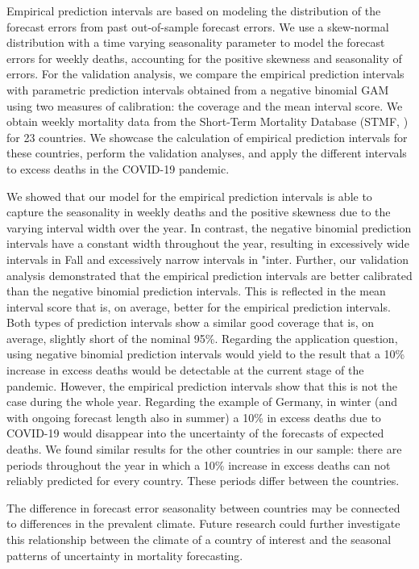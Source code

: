 \documentclass[12pt]{article}
\begin{document}
Empirical prediction intervals are based on modeling the distribution of the forecast errors from past out-of-sample forecast errors. We use a skew-normal distribution with a time varying seasonality parameter to model the forecast errors for weekly deaths, accounting for the positive skewness and seasonality of errors. For the validation analysis, we compare the empirical prediction intervals with parametric prediction intervals obtained from a negative binomial GAM using two measures of calibration: the coverage and the mean interval score. We obtain weekly mortality data from the Short-Term Mortality Database (STMF, \cite{Jdanov2021a}) for 23 countries. We showcase the calculation of empirical prediction intervals for these countries, perform the validation analyses, and apply the different intervals to excess deaths in the COVID-19 pandemic.

We showed that our model for the empirical prediction intervals is able to capture the seasonality in weekly deaths and the positive skewness due to the varying interval width over the year. In contrast, the negative binomial prediction intervals have a constant width throughout the year, resulting in excessively wide intervals in Fall and excessively narrow intervals in "inter. Further, our validation analysis demonstrated that the empirical prediction intervals are better calibrated than the negative binomial prediction intervals. This is reflected in the mean interval score that is, on average, better for the empirical prediction intervals. Both types of prediction intervals show a similar good coverage that is, on average, slightly short of the nominal 95\%. Regarding the application question, using negative binomial prediction intervals would yield to the result that a 10\% increase in excess deaths would be detectable at the current stage of the pandemic. However, the empirical prediction intervals show that this is not the case during the whole year. Regarding the example of Germany, in winter (and with ongoing forecast length also in summer) a 10\% in excess deaths due to COVID-19 would disappear into the uncertainty of the forecasts of expected deaths. We found similar results for the other countries in our sample: there are periods throughout the year in which a 10\% increase in excess deaths can not reliably predicted for every country. These periods differ between the countries.

The difference in forecast error seasonality between countries may be connected to differences in the prevalent climate. Future research could further investigate this relationship between the climate of a country of interest and the seasonal patterns of uncertainty in mortality forecasting.
\end{document}
